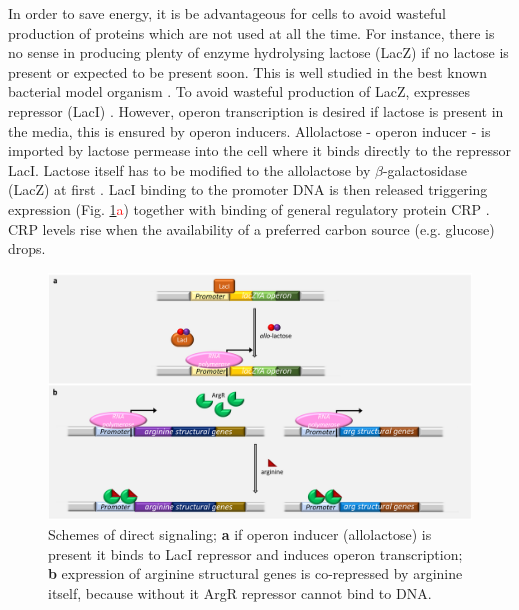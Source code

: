 In order to save energy, it is be advantageous for cells to avoid wasteful production of proteins which are not used at all the time.
For instance, there is no sense in producing plenty of enzyme hydrolysing lactose (LacZ) if no lactose is present or expected to be present soon.
This is well studied in the best known bacterial model organism .
To avoid wasteful production of LacZ,  expresses  repressor (LacI) \cite{hudson1990co}.
However,  operon transcription is desired if lactose is present in the media, this is ensured by  operon inducers.
Allolactose -  operon inducer - is imported by lactose permease into the cell where it binds directly to the repressor LacI.
Lactose itself has to be modified to the allolactose by $\beta$-galactosidase (LacZ) at first \cite{jobe1972lac, wheatley2013structural}.
LacI binding to the promoter DNA is then released triggering  expression (Fig. \ref{dir}\textcolor{red}{a}) together with binding of general regulatory protein CRP \cite{hudson1990co, clark2005molecular}.
CRP levels rise when the availability of a preferred carbon source (e.g. glucose) drops.

\begin{figure}[ht]
  \centering
  \includegraphics[scale=0.27]{text/Pictures/DirectSignaling.png}
	\caption{Schemes of direct signaling; \textbf{a} if  operon inducer (allolactose) is present it binds to LacI repressor and induces  operon transcription; \textbf{b} expression of arginine structural genes is co-repressed by arginine itself, because without it ArgR repressor cannot bind to DNA.}
	\label{dir}
\end{figure}

